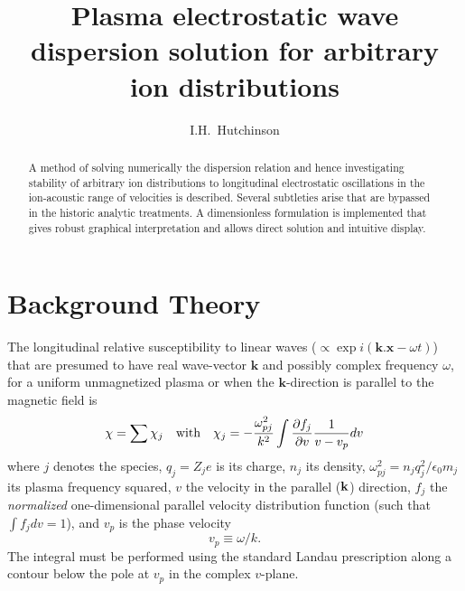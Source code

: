 \documentclass[12pt]{article}
\title{Plasma electrostatic wave dispersion solution for arbitrary ion
  distributions} \author{I.H.~Hutchinson}
\begin{document}
\maketitle

\begin{abstract}
A method of solving numerically the dispersion relation and hence
investigating stability of arbitrary ion distributions to longitudinal
electrostatic oscillations in the ion-acoustic range of velocities is described.
Several subtleties arise that are bypassed in the historic analytic
treatments. A dimensionless formulation is implemented that gives
robust graphical interpretation and allows direct solution and
intuitive display.
\end{abstract}

\section{Background Theory}

The longitudinal relative susceptibility to linear waves
($\propto \exp i({\bm k.\bm x}-\omega t)$) that are presumed to have real
wave-vector ${\bm k}$ and possibly complex frequency $\omega$, for a
uniform unmagnetized plasma or when the  $\bm k$-direction is parallel
to the magnetic field is
\begin{equation}
\chi=\sum \chi_j\quad \mbox{with}\quad
  \chi_j = -{\omega_{pj}^2\over k^2} \int {\partial
    f_j\over \partial v } {1\over v- v_p} dv
\end{equation}
where $j$ denotes the species, $q_j=Z_je$ is its charge, $n_j$ its
density, $\omega_{pj}^2=n_j q_j^2/\epsilon_0 m_j$ its plasma frequency
squared, $v$ the velocity in the parallel (${\bf k}$) direction, $f_j$
the \emph{normalized} one-dimensional parallel velocity distribution
function (such that $\int f_j dv=1$), and $v_p$ is the phase velocity
\begin{equation}
  \label{eq:phasevel}
  v_p\equiv \omega/k.
\end{equation}
The integral must be performed using the standard Landau
prescription along a contour below the pole at $v_p$ in the complex
$v$-plane.
\end{document}
